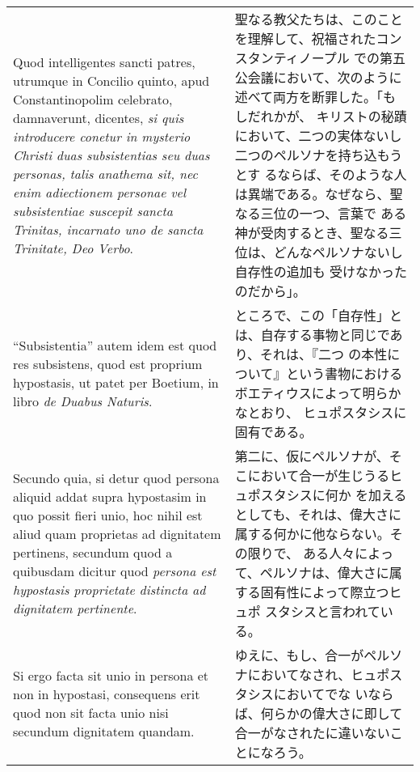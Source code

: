\documentclass[10pt]{jsarticle} %
\begin{document}
\begin{longtable}{p{21em}p{21em}}
\\


Quod intelligentes sancti patres, utrumque in Concilio quinto, apud
Constantinopolim celebrato, damnaverunt, dicentes, {\itshape si quis
introducere conetur in mysterio Christi duas subsistentias seu duas
personas, talis anathema sit, nec enim adiectionem personae vel
subsistentiae suscepit sancta Trinitas, incarnato uno de sancta
Trinitate, Deo Verbo}.


&

聖なる教父たちは、このことを理解して、祝福されたコンスタンティノープル
での第五公会議において、次のように述べて両方を断罪した。「もしだれかが、
キリストの秘蹟において、二つの実体ないし二つのペルソナを持ち込もうとす
るならば、そのような人は異端である。なぜなら、聖なる三位の一つ、言葉で
ある神が受肉するとき、聖なる三位は、どんなペルソナないし自存性の追加も
受けなかったのだから」。

\\


``Subsistentia'' autem idem est quod res subsistens, quod est proprium
hypostasis, ut patet per Boetium, in libro {\itshape de Duabus
Naturis}.



&

ところで、この「自存性」とは、自存する事物と同じであり、それは、『二つ
の本性について』という書物におけるボエティウスによって明らかなとおり、
ヒュポスタシスに固有である。


\\

Secundo quia, si detur quod persona aliquid addat supra hypostasim in
quo possit fieri unio, hoc nihil est aliud quam proprietas ad
dignitatem pertinens, secundum quod a quibusdam dicitur quod {\itshape
persona est hypostasis proprietate distincta ad dignitatem
pertinente}.



&

第二に、仮にペルソナが、そこにおいて合一が生じうるヒュポスタシスに何か
を加えるとしても、それは、偉大さに属する何かに他ならない。その限りで、
ある人々によって、ペルソナは、偉大さに属する固有性によって際立つヒュポ
スタシスと言われている。


\\

Si ergo facta sit unio in persona et non in hypostasi, consequens erit
quod non sit facta unio nisi secundum dignitatem quandam.


&

ゆえに、もし、合一がペルソナにおいてなされ、ヒュポスタシスにおいてでな
いならば、何らかの偉大さに即して合一がなされたに違いないことになろう。



\end{longtable}
\end{document}
